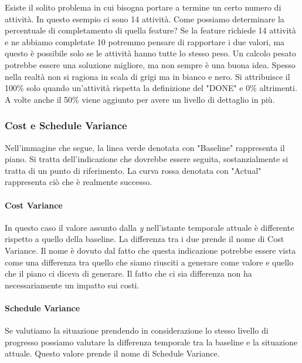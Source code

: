 \begin{info}
	Esiste il solito problema in cui bisogna portare a termine un certo numero di attività. In questo esempio ci sono 14 attività. Come possiamo determinare la percentuale di completamento di quella feature?\newline
	Se la feature richiede 14 attività e ne abbiamo completate 10 potremmo pensare di rapportare i due valori, ma questo è possibile solo se le attività hanno tutte lo stesso peso. Un calcolo pesato potrebbe essere una soluzione migliore, ma non sempre è una buona idea. Spesso nella realtà non si ragiona in scala di grigi ma in bianco e nero. Si attribuisce il 100\% solo quando un'attività rispetta la definizione del "DONE" e 0\% altrimenti. A volte anche il 50\% viene aggiunto per avere un livello di dettaglio in più.
\end{info}

\subsubsection{Cost e Schedule Variance}
Nell'immagine che segue, la linea verde denotata con "Baseline" rappresenta il piano. Si tratta dell'indicazione che dovrebbe essere seguita, sostanzialmente si tratta di un punto di riferimento.
La curva rossa denotata con "Actual" rappresenta ciò che è realmente successo.

\paragraph{Cost Variance}
In questo caso il valore assunto dalla \textit{y} nell'istante temporale attuale è differente rispetto a quello della baseline. La differenza tra i due prende il nome di Cost Variance. Il nome è dovuto dal fatto che questa indicazione potrebbe essere vista come una differenza tra quello che siamo riusciti a generare come valore e quello che il piano ci diceva di generare. Il fatto che ci sia differenza non ha necessariamente un impatto sui costi.

\paragraph{Schedule Variance}
Se valutiamo la situazione  prendendo in considerazione lo stesso livello di progresso possiamo valutare la differenza temporale tra la baseline e la situazione attuale. Questo valore prende il nome di Schedule Variance.

